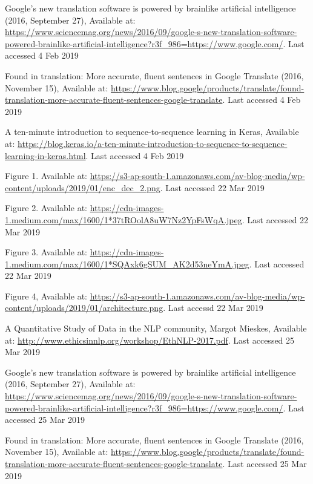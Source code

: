 \documentclass[runningheads]{llncs}
\begin{document}
\begin{thebibliography}{8}
	
	
	Google’s new translation software is powered by brainlike artificial intelligence (2016, September 27), Available at:
	\url{https://www.sciencemag.org/news/2016/09/google-s-new-translation-software-powered-brainlike-artificial-intelligence?r3f\_986=https://www.google.com/}.  Last accessed 4 Feb 2019
	
	
	Found in translation: More accurate, fluent sentences in Google Translate (2016, November 15), Available at: \url{https://www.blog.google/products/translate/found-translation-more-accurate-fluent-sentences-google-translate}.  Last accessed 4 Feb 2019

	A ten-minute introduction to sequence-to-sequence learning in Keras, Available at: \url{https://blog.keras.io/a-ten-minute-introduction-to-sequence-to-sequence-learning-in-keras.html}.  Last accessed 4 Feb 2019
	
	Figure 1. Available at: \url{https://s3-ap-south-1.amazonaws.com/av-blog-media/wp-content/uploads/2019/01/enc_dec_2.png}.  Last accessed 22 Mar 2019
	
	Figure 2. Available at: \url{https://cdn-images-1.medium.com/max/1600/1*37tROolA8uW7Nz2YpFsWqA.jpeg}.  Last accessed 22 Mar 2019

	Figure 3. Available at: \url{https://cdn-images-1.medium.com/max/1600/1*SQAxk6gSUM_AK2d53neYmA.jpeg}. Last accessed 22 Mar 2019

	Figure 4, Available at: \url{https://s3-ap-south-1.amazonaws.com/av-blog-media/wp-content/uploads/2019/01/architecture.png}. Last accessd 22 Mar 2019
	
	A Quantitative Study of Data in the NLP community, Margot Mieskes, Available at: \url{http://www.ethicsinnlp.org/workshop/EthNLP-2017.pdf}.  Last accessed 25 Mar 2019

	Google’s new translation software is powered by brainlike artificial intelligence (2016, September 27), Available at: \url{https://www.sciencemag.org/news/2016/09/google-s-new-translation-software-powered-brainlike-artificial-intelligence?r3f\_986=https://www.google.com/}.  Last accessed 25 Mar 2019

	Found in translation: More accurate, fluent sentences in Google Translate (2016, November 15), Available at: \url{https://www.blog.google/products/translate/found-translation-more-accurate-fluent-sentences-google-translate}.  Last accessed 25 Mar 2019


\end{thebibliography}
\end{document}
